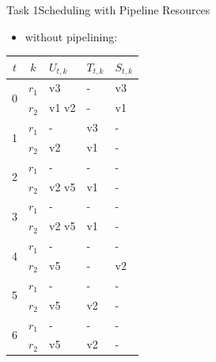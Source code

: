 \begin{frame}{Task 1}{Scheduling with Pipeline Resources}
  \begin{solutionnoinc}
    \begin{itemize}
      \item \alert{without pipelining}:
    \end{itemize}
      \centering
      \fontsize{3}{4}\selectfont
      \begin{tabular}{c|c|l|l|l|}
      \hline$t$                  & $k$   & $U_{t, k}$ & $T_{t, k}$ & $S_{t, k}$ \\
      \hline \multirow{2}{*}{0}  & $r_1$ & v3         & -          & v3 \\
      \cline { 2 - 5 }           & $r_2$ & v1 v2      & -          & v1 \\
      \hline \multirow{2}{*}{1}  & $r_1$ & -          & v3         & -  \\
      \cline { 2 - 5 }           & $r_2$ & v2         & v1         & -  \\
      \hline \multirow{2}{*}{2}  & $r_1$ & -          & -          & -  \\
      \cline { 2 - 5 }           & $r_2$ & v2 v5      & v1         & -  \\
      \hline \multirow{2}{*}{3}  & $r_1$ & -          & -          & -  \\
      \cline { 2 - 5 }           & $r_2$ & v2 v5      & v1         & -  \\
      \hline \multirow{2}{*}{4}  & $r_1$ & -          & -          & -  \\
      \cline { 2 - 5 }           & $r_2$ & v5         & -          & v2 \\
      \hline \multirow{2}{*}{5}  & $r_1$ & -          & -          & -  \\
      \cline { 2 - 5 }           & $r_2$ & v5         & v2         & -  \\
      \hline \multirow{2}{*}{6}  & $r_1$ & -          & -          & -  \\
      \cline { 2 - 5 }           & $r_2$ & v5         & v2         & -  \\

\end{tabular}
\end{solutionnoinc}
\end{frame}
